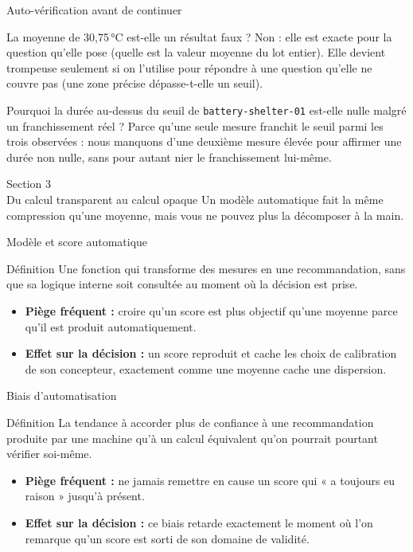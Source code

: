 \documentclass[aspectratio=169]{beamer}
\begin{document}
\begin{frame}{Auto-vérification avant de continuer}
  \small
  \begin{block}{La moyenne de 30,75\,°C est-elle un résultat faux ?}
    Non : elle est exacte pour la question qu'elle pose (quelle est la valeur moyenne du lot entier). Elle devient trompeuse seulement si on l'utilise pour répondre à une question qu'elle ne couvre pas (une zone précise dépasse-t-elle un seuil).
  \end{block}
  \begin{block}{Pourquoi la durée au-dessus du seuil de \texttt{battery-shelter-01} est-elle nulle malgré un franchissement réel ?}
    Parce qu'une seule mesure franchit le seuil parmi les trois observées : nous manquons d'une deuxième mesure élevée pour affirmer une durée non nulle, sans pour autant nier le franchissement lui-même.
  \end{block}
\end{frame}

\begin{frame}[plain]
  \centering
  \Huge Section 3\\[3mm]
  \Large Du calcul transparent au calcul opaque
  \vfill
  \normalsize Un modèle automatique fait la même compression qu'une moyenne, mais vous ne pouvez plus la décomposer à la main.
\end{frame}

\begin{frame}{Modèle et score automatique}
  \begin{block}{Définition}
    Une fonction qui transforme des mesures en une recommandation, sans que sa logique interne soit consultée au moment où la décision est prise.
  \end{block}
  \begin{itemize}
    \item \textbf{Piège fréquent :} croire qu'un score est plus objectif qu'une moyenne parce qu'il est produit automatiquement.
    \item \textbf{Effet sur la décision :} un score reproduit et cache les choix de calibration de son concepteur, exactement comme une moyenne cache une dispersion.
  \end{itemize}
\end{frame}

\begin{frame}{Biais d'automatisation}
  \begin{block}{Définition}
    La tendance à accorder plus de confiance à une recommandation produite par une machine qu'à un calcul équivalent qu'on pourrait pourtant vérifier soi-même.
  \end{block}
  \begin{itemize}
    \item \textbf{Piège fréquent :} ne jamais remettre en cause un score qui « a toujours eu raison » jusqu'à présent.
    \item \textbf{Effet sur la décision :} ce biais retarde exactement le moment où l'on remarque qu'un score est sorti de son domaine de validité.
  \end{itemize}
\end{frame}
\end{document}

